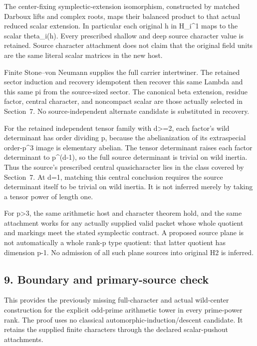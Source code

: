The center-fixing symplectic-extension isomorphism, constructed by
matched Darboux lifts and complex roots, maps their balanced product to
that actual reduced scalar extension. In particular each original h in
H\_i\^{}1 maps to the scalar theta\_i(h). Every prescribed shallow and
deep source character value is retained. Source character attachment
does not claim that the original field units are the same literal scalar
matrices in the new host.

Finite Stone--von Neumann supplies the full carrier intertwiner. The
retained sector induction and recovery idempotent then recover this same
Lambda and this same pi from the source-sized sector. The canonical beta
extension, residue factor, central character, and noncompact scalar are
those actually selected in Section~7. No source-independent alternate
candidate is substituted in recovery.

For the retained independent tensor family with d\textgreater=2, each
factor's wild determinant has order dividing p, because the
abelianization of its extraspecial order-p\^{}3 image is elementary
abelian. The tensor determinant raises each factor determinant to
p\^{}(d-1), so the full source determinant is trivial on wild inertia.
Thus the source's prescribed central quasicharacter lies in the class
covered by Section~7. At d=1, matching this central conclusion requires
the source determinant itself to be trivial on wild inertia. It is not inferred merely by taking a tensor power of length one.

For p\textgreater3, the same arithmetic host and character theorem hold,
and the same attachment works for any actually supplied valid packet
whose whole quotient and markings meet the stated symplectic contract. A
proposed source plane is not automatically a whole rank-p type quotient:
that latter quotient has dimension p-1. No admission of all such plane
sources into original H2 is inferred.

\hypertarget{odd_character-boundary-and-primary-source-check}{%
\subsection{9. Boundary and primary-source
check}\label{odd_character-boundary-and-primary-source-check}}

This provides the previously missing full-character and actual
wild-center construction for the explicit odd-prime arithmetic tower in
every prime-power rank. The proof uses no classical
automorphic-induction/descent candidate. It retains the supplied finite
characters through the declared scalar-pushout attachments.

